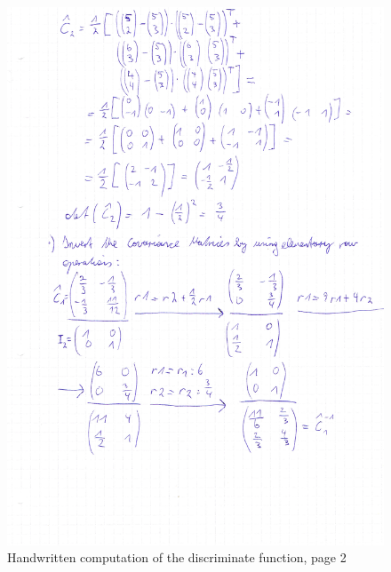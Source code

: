 \documentclass[subfigure,epsfig,fleqn,amssmb,float,caption,ausarbeitung]{scrartcl}
\begin{document}
\begin{figure}
\includegraphics[width=14cm]{img/discriminantFunction2.jpg}
	\caption{Handwritten computation of the discriminate function, page 2}
	\label{fig:hws2}
\end{figure}
\end{document}
